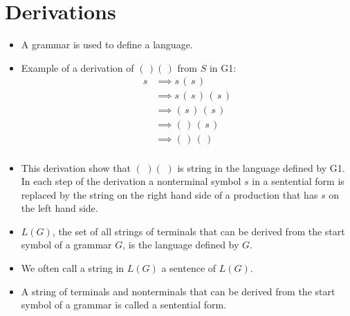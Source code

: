 \documentclass[]{article}
\begin{document}
\section{Derivations}
  \begin{itemize}
    \item A grammar is used to define a language.
    \item Example of a derivation of $(\,)(\,)$ from $S$ in G1:
      \begin{align*}
        s & \implies s \, (\,s\,)            \\
          & \implies s \, (\,s\,) \, (\,s\,) \\
          & \implies      (\,s\,) \, (\,s\,) \\
          & \implies      (\,   ) \, (\,s\,) \\
          & \implies      (\,   ) \, (\,   ) \\ 
      \end{align*}
    \item This derivation show that $(\,\,)(\,\,)$ is string in the language
    defined by G1. In each step of the derivation a nonterminal symbol $s$ in a
    sentential form is replaced by the string on the right hand side of a 
    production that has $s$ on the left hand side.
    \item $L(G)$, the set of all strings of terminals that can be derived from
    the start symbol of a grammar $G$, is the language defined by $G$.
    \item We often call a string in $L(G)$ a sentence of $L(G)$.
    \item A string of terminals and nonterminals that can be derived from the 
    start symbol of a grammar is called a sentential form.
  \end{itemize}
  
\end{document}
